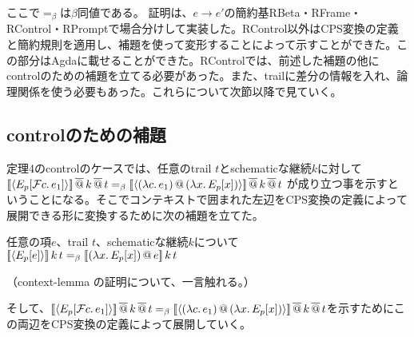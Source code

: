 ここで$=_{\beta}$は$\beta$同値である。
証明は、$e \to e'$の簡約基\textsf{RBeta}・\textsf{RFrame}・\textsf{RControl}・\textsf{RPrompt}で場合分けして実装した。\textsf{RControl}以外はCPS変換の定義と簡約規則を適用し、補題を使って変形することによって示すことができた。この部分はAgdaに載せることができた。\textsf{RControl}では、前述した補題の他にcontrolのための補題を立てる必要があった。また、trailに差分の情報を入れ、論理関係を使う必要もあった。これらについて次節以降で見ていく。


\subsection{controlのための補題}
定理4のcontrolのケースでは、任意のtrail $t$とschematicな継続$k$に対して\\
$[\![{\langle{E_p[{\cal F}{c}.\,{e_1}]}\rangle}]\!]\,\overline{@}\, k \,\overline{@}\, t =_{\beta} [\![{\langle{{(\lambda{c}.\,{e_1})}\,@\,{(\lambda{x}.\,{E_p[x]})}}\rangle}]\!] \,\overline{@}\, k \,\overline{@}\, t$ が成り立つ事を示すということになる。そこでコンテキストで囲まれた左辺をCPS変換の定義によって展開できる形に変換するために次の補題を立てた。

\begin{lemma}\upshape
  任意の項$e$、trail $t$、schematicな継続$k$について\\
  $[\![{\langle{E_p[e]}\rangle}]\!]\,k\,t =_{\beta} [\![{{(\lambda{x}.\,{E_p[x]})}\,@\,{e}}]\!]\,k\,t$
\end{lemma}
（context-lemma の証明について、一言触れる。）

そして、$[\![{\langle{E_p[{\cal F}{c}.\,{e_1}]}\rangle}]\!]\,\overline{@}\, k \,\overline{@}\, t =_{\beta} [\![{\langle{{(\lambda{c}.\,{e_1})}\,@\,{(\lambda{x}.\,{E_p[x]})}}\rangle}]\!] \,\overline{@}\, k \,\overline{@}\, t$を示すためにこの両辺をCPS変換の定義によって展開していく。


